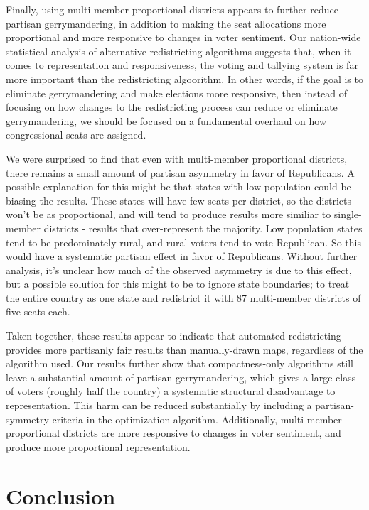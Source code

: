 \documentclass[preprint,12pt]{article}
\begin{document}
Finally, using multi-member proportional districts appears to further reduce partisan gerrymandering, in addition to making the seat allocations more proportional and more responsive to changes in voter sentiment.  Our nation-wide statistical analysis of alternative redistricting algorithms suggests that, when it comes to representation and responsiveness, the voting and tallying system is far more important than the redistricting algoorithm.  In other words, if the goal is to eliminate gerrymandering and make elections more responsive, then instead of focusing on how changes to the redistricting process can reduce or eliminate gerrymandering, we should be focused on a fundamental overhaul on how congressional seats are assigned.

We were surprised to find that even with multi-member proportional districts, there remains a small amount of partisan asymmetry in favor of Republicans.
A possible explanation for this might be that states with low population could be biasing the results.
These states will have few seats per district, so the districts won't be as proportional, and will tend to produce results more similiar to single-member districts - results that over-represent the majority.
Low population states tend to be predominately rural, and rural voters tend to vote Republican.  So this would have a systematic partisan effect in favor of Republicans.
Without further analysis, it's unclear how much of the observed asymmetry is due to this effect, but a possible solution for this might to be to ignore state boundaries; to treat the entire country as one state and redistrict it with 87 multi-member districts of five seats each.

Taken together, these results appear to indicate that automated redistricting provides more partisanly fair results than manually-drawn maps, regardless of the algorithm used.  Our results further show that compactness-only algorithms still leave a substantial amount of partisan gerrymandering, which gives a large class of voters (roughly half the country) a systematic structural disadvantage to representation.  This harm can be reduced substantially by including a partisan-symmetry criteria in the optimization algorithm.  Additionally, multi-member proportional districts are more responsive to changes in voter sentiment, and produce more proportional representation.

\section{Conclusion}
\end{document}
